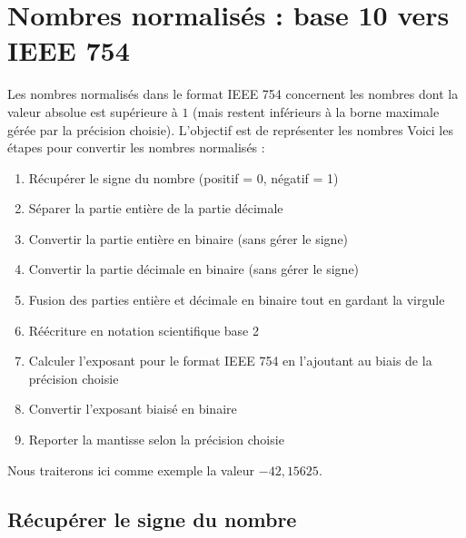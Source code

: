 \documentclass[11pt,a4paper]{article}
\begin{document}
\bigskip




\section{Nombres normalisés : base 10 vers IEEE 754}

\bigskip

Les nombres normalisés dans le format IEEE 754 concernent les nombres dont la valeur absolue est supérieure à $ 1 $ (mais restent inférieurs à la borne maximale gérée par la précision choisie).
L'objectif est de représenter les nombres
Voici les étapes pour convertir les nombres normalisés :

\medskip

\begin{enumerate}
\item Récupérer le signe du nombre (positif = 0, négatif = 1)
\item Séparer la partie entière de la partie décimale
\item Convertir la partie entière en binaire (sans gérer le signe)
\item Convertir la partie décimale en binaire (sans gérer le signe)
\item Fusion des parties entière et décimale en binaire tout en gardant la virgule
\item Réécriture en notation scientifique base 2
\item Calculer l'exposant pour le format IEEE 754 en l'ajoutant au biais de la précision choisie
\item Convertir l'exposant biaisé en binaire
\item Reporter la mantisse selon la précision choisie
\end{enumerate}

\bigskip

Nous traiterons ici comme exemple la valeur $ - 42,15625 $.

\bigskip

\subsection{Récupérer le signe du nombre}
\end{document}
